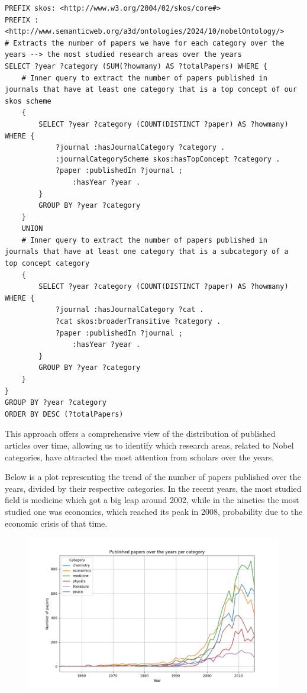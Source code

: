 \documentclass{article}
\begin{document}
\begin{lstlisting}
PREFIX skos: <http://www.w3.org/2004/02/skos/core#>
PREFIX : <http://www.semanticweb.org/a3d/ontologies/2024/10/nobelOntology/>
# Extracts the number of papers we have for each category over the years --> the most studied research areas over the years
SELECT ?year ?category (SUM(?howmany) AS ?totalPapers) WHERE {
    # Inner query to extract the number of papers published in journals that have at least one category that is a top concept of our skos scheme
    {
        SELECT ?year ?category (COUNT(DISTINCT ?paper) AS ?howmany) WHERE {
            ?journal :hasJournalCategory ?category .
            :journalCategoryScheme skos:hasTopConcept ?category .
            ?paper :publishedIn ?journal ;
                :hasYear ?year .
        } 
        GROUP BY ?year ?category
    }
    UNION
    # Inner query to extract the number of papers published in journals that have at least one category that is a subcategory of a top concept category
    {
        SELECT ?year ?category (COUNT(DISTINCT ?paper) AS ?howmany) WHERE {
            ?journal :hasJournalCategory ?cat .
            ?cat skos:broaderTransitive ?category .
            ?paper :publishedIn ?journal ;
                :hasYear ?year .
        } 
        GROUP BY ?year ?category
    }
} 
GROUP BY ?year ?category
ORDER BY DESC (?totalPapers)    
\end{lstlisting}

\newpage

\noindent This approach offers a comprehensive view of the distribution of published articles over time, allowing us to identify which research areas, related
to Nobel categories, have attracted the most attention from scholars over the years.

\noindent Below is a plot representing the trend of the number of papers published over the years, divided by their respective categories.
In the recent years, the most studied field is medicine which got a big leap around 2002, while in the nineties the most studied one was economics, which
reached its peak in 2008, probability due to the economic crisis of that time.
\begin{figure}[ht]
	\centering
	\includegraphics[width=\textwidth]{../queries/plots/papersPerCategory.png}
\end{figure}
\end{document}
